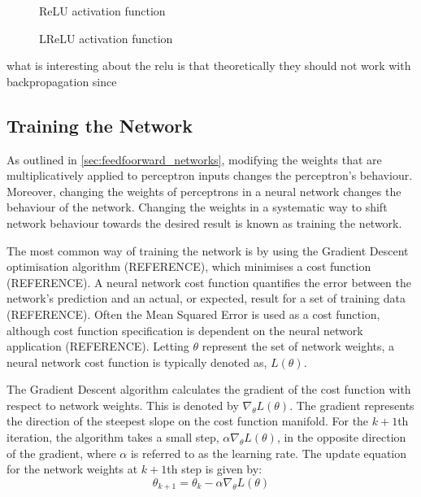\begin{figure}[h]
	\centering
	\begin{minipage}[t]{0.45\textwidth}
		\centering
		
		\caption[ReLU activation function]{ReLU activation function}
		\label{fig:2305_relu_activation_function}
	\end{minipage}
	\hspace{1cm}
	\begin{minipage}[t]{0.45\textwidth}
		\centering
		
		\caption[LReLU activation function]{LReLU activation function}
		\label{fig:2306_lrelu_activation_function}
	\end{minipage}
\end{figure}

 

what is interesting about the relu is that theoretically they should not work with backpropagation since 



\subsection{Training the Network} \label{sec:networktraining}
As outlined in \textsection \ref{sec:feedfoorward_networks}, modifying the weights that are multiplicatively applied to perceptron inputs changes the perceptron's behaviour. Moreover, changing the weights of perceptrons in a neural network changes the behaviour of the network. Changing the weights in a systematic way to shift network behaviour towards the desired result is known as training the network.

The most common way of training the network is by using the Gradient Descent optimisation algorithm (REFERENCE), which minimises a cost function (REFERENCE). A neural network cost function quantifies the error between the network's prediction and an actual, or expected, result for a set of training data (REFERENCE). Often the Mean Squared Error is used as a cost function, although cost function specification is dependent on the neural network application (REFERENCE). Letting $\theta$ represent the set of network weights, a neural network cost function is typically denoted as, $L(\theta)$.

The Gradient Descent algorithm calculates the gradient of the cost function with respect to network weights. This is denoted by $\nabla_{\theta}L(\theta)$. The gradient represents the direction of the steepest slope on the cost function manifold. For the $k+1$th iteration, the algorithm takes a small step, $\alpha \nabla_{\theta}L(\theta)$, in the opposite direction of the gradient, where $\alpha$ is referred to as the learning rate. The update equation for the network weights at $k+1$th step is given by:
\begin{equation}
	\theta_{k+1} = \theta_{k} - \alpha \nabla_{\theta} L(\theta)
\end{equation} 

